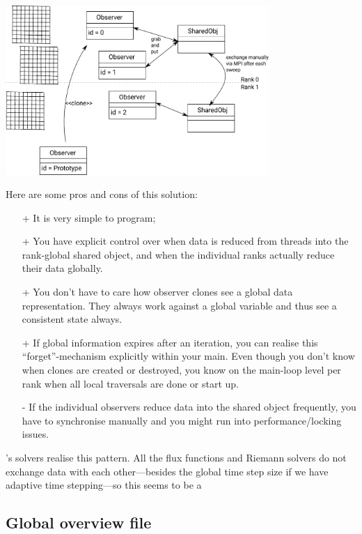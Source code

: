 \begin{center}
 \includegraphics[width=0.75\textwidth]{37_synchronisation/synchronisation-01.pdf}
\end{center}


Here are some pros and cons of this solution:
\begin{itemize}
  \item[+] It is very simple to program;
  \item[+] You have explicit control over when data is reduced from threads into
  the rank-global shared object, and when the individual ranks actually reduce
  their data globally.
  \item[+] You don't have to care how observer clones see a global data
  representation. They always work against a global variable and thus see a
  consistent state always.
  \item[+] If global information expires after an iteration, you can realise
  this ``forget''-mechanism explicitly within your main. Even though you don't
  know when clones are created or destroyed, you know on the main-loop level per
  rank when all local traversals are done or start up.
  \item[-] If the individual observers reduce data into the shared object
  frequently, you have to synchronise manually and you might run into
  performance/locking issues.
\end{itemize}


\begin{remark}
 \ExaHyPE's solvers realise this pattern.
 All the flux functions and Riemann solvers do not exchange data with each
 other---besides the global time step size if we have adaptive time
 stepping---so this seems to be a 
\end{remark}



\subsection*{Global overview file}

